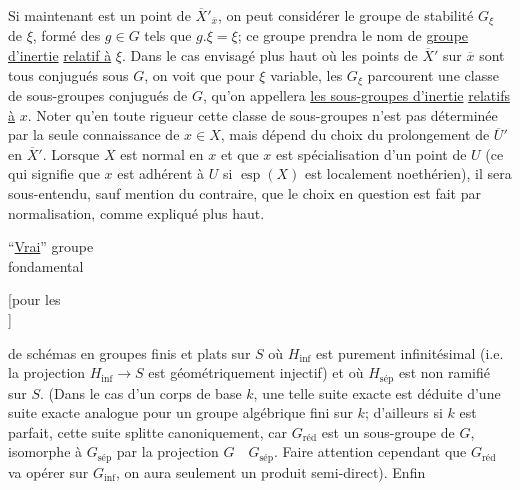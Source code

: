 Si maintenant  \inserted{$\xi$} est un point de $\overline X'_{\overline x}$, on peut considérer le groupe de stabilité $G_\xi$ de $\xi$, formé des $g\in G$ tels que $g.\xi=\xi$; ce groupe prendra le nom de \uline{groupe d'inertie} \uline{relatif à} $\xi$. Dans le cas envisagé plus haut où les points de $\overline X'$ sur $\overline x$ sont tous conjugués sous $G$, on voit que pour $\xi$ variable, les $G_\xi$ parcourent une classe de sous-groupes conjugués de $G$, qu'on appellera  \uline{les sous-groupes d'inertie}  \uline{relatifs à} $x$. Noter qu'en toute rigueur cette classe de sous-groupes  n'est pas déterminée par la seule connaissance de $x\in X$, mais dépend du choix du prolongement de $\overline U'$ en $\overline X'$. Lorsque $X$ est normal en $x$ et que $x$ est spécialisation d'un point de $U$ (ce qui signifie que $x$ est adhérent à $U$ si $\operatorname{esp}(X)$ est localement noethérien), il sera sous-entendu, sauf mention du contraire, que le choix en question est fait par normalisation, comme expliqué plus haut.
\begin{flushright}
``\uline{Vrai}'' groupe\\
fondamental

[pour les\\
]
\end{flushright}
 de schémas en groupes finis et plats sur $S$
où $H_{\mathrm{inf}}$ est purement infinitésimal (i.e. la projection $H_{\mathrm{inf}}\to S$ est géométriquement injectif) et où $H_{\text{sép}}$ est non ramifié sur $S$. (Dans le cas d'un corps de base $k$, une telle suite exacte est déduite d'une suite exacte analogue pour un groupe algébrique fini  sur $k$; d'ailleurs si $k$ est parfait, cette suite splitte canoniquement, car $G_{\text{réd}}$ est  un sous-groupe de $G$, isomorphe à $G_{\text{sép}}$ par la projection $G\quad G_{\text{sép}}$. Faire attention cependant que $G_{\text{réd}}$ va opérer sur $G_{\mathrm{inf}}$, on aura seulement un produit semi-direct). Enfin

